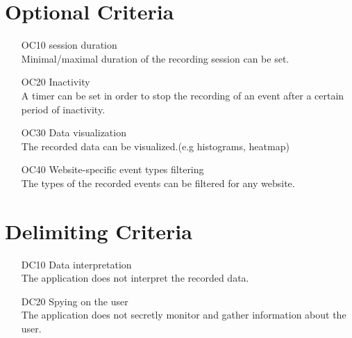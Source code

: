 \section{Optional Criteria}

\begin{itemize}

	\item[OC10]\Gls{session} duration\\Minimal/maximal duration of the recording \gls{session} can be set.
	\item[OC20]Inactivity\\A timer can be set in order to stop the recording of an \gls{event} after a certain period of inactivity.
	\item[OC30]Data visualization\\The recorded data can be visualized.(e.g histograms, heatmap)
	\item[OC40]Website-specific event types filtering\\The types of the recorded \glspl{event} can be filtered for any website.

\end{itemize}

\section{Delimiting Criteria}

\begin{itemize}

	\item[DC10]Data interpretation\\The application does not interpret the recorded data.
	\item[DC20]Spying on the \gls{user}\\The application does not secretly monitor and gather information about the \gls{user}.
	
\end{itemize}